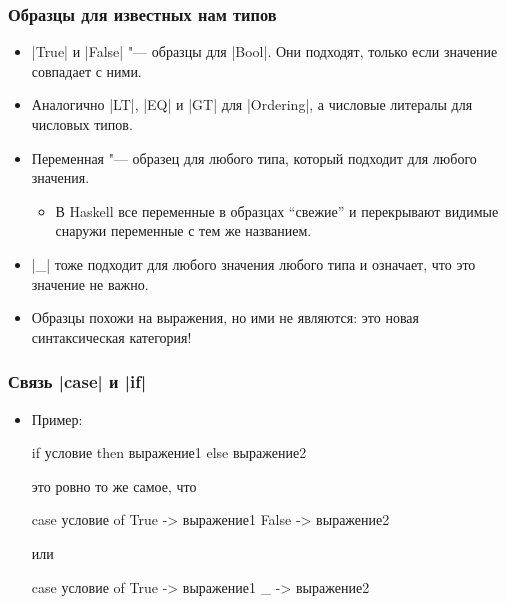 \documentclass[10pt]{beamer}
\begin{document}
\begin{frame}[fragile]
  \frametitle{Образцы для известных нам типов}
  \begin{itemize}
    \item \haskinline|True| и \haskinline|False| "--- образцы для \haskinline|Bool|. Они подходят, только если значение совпадает с ними.
    \item Аналогично \haskinline|LT|, \haskinline|EQ| и \haskinline|GT| для \haskinline|Ordering|, а числовые литералы для числовых типов.
    \item Переменная "--- образец для любого типа, который подходит для любого значения.
          \begin{itemize}
            \item В Haskell все переменные в образцах \enquote{свежие} и перекрывают видимые снаружи переменные с тем же названием.
          \end{itemize}
    \item \haskinline|_| тоже подходит для любого значения любого типа и означает, что это значение не важно.
    \item Образцы похожи на выражения, но ими не являются: это новая синтаксическая категория!
  \end{itemize}
\end{frame}

\begin{frame}[fragile]
  \frametitle{Связь \haskinline|case| и \haskinline|if|}
  \begin{itemize}
    \item Пример:
          \begin{haskell}
            if условие 
                then выражение1 
                else выражение2
          \end{haskell}
          это ровно то же самое, что
          \begin{haskell}
            case условие of
                True -> выражение1 
                False -> выражение2
          \end{haskell}
          или
          \begin{haskell}
            case условие of
                True -> выражение1 
                _ -> выражение2
          \end{haskell}
  \end{itemize}
\end{frame}
\end{document}
